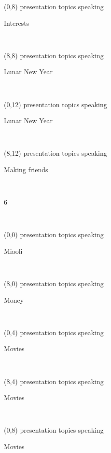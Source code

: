 \documentclass[a4paper]{article}
\newcommand{\mycard}[5]{%
	\small #1 #2
	\par
	\parbox[t][6.7cm][c]{9.5cm}{%
	\hspace{0.1cm} \Large#3\\
	\normalsize#4 #5
	}
}
\begin{document}
\begin{textblock}{8}(0,8)
\mycard{presentation topics}{speaking}{\parbox{9.0cm}{
\centering Interests       
}}{}{} 
\end{textblock}

\begin{textblock}{8}(8,8)
\mycard{presentation topics}{speaking}{\parbox{9.0cm}{
\centering Lunar New Year  
}}{}{} 
\end{textblock}

\begin{textblock}{8}(0,12)
\mycard{presentation topics}{speaking}{\parbox{9.0cm}{
\centering Lunar New Year     
}}{}{} 
\end{textblock}

\begin{textblock}{8}(8,12)
\mycard{presentation topics}{speaking}{\parbox{9.0cm}{
\centering Making friends   
}}{}{} 
\end{textblock}

\begin{tiny}6\end{tiny}\\
\newpage

\begin{textblock}{8}(0,0)
\mycard{presentation topics}{speaking}{\parbox{9.0cm}{
\centering Miaoli  
}}{}{} 
\end{textblock}

\begin{textblock}{8}(8,0)
\mycard{presentation topics}{speaking}{\parbox{9.0cm}{
\centering Money        
}}{}{} 
\end{textblock}

\begin{textblock}{8}(0,4)
\mycard{presentation topics}{speaking}{\parbox{9.0cm}{
\centering Movies      
}}{}{} 
\end{textblock}

\begin{textblock}{8}(8,4)
\mycard{presentation topics}{speaking}{\parbox{9.0cm}{
\centering Movies      
}}{}{} 
\end{textblock}

\begin{textblock}{8}(0,8)
\mycard{presentation topics}{speaking}{\parbox{9.0cm}{
\centering Movies          
}}{}{} 
\end{textblock}
\end{document}
